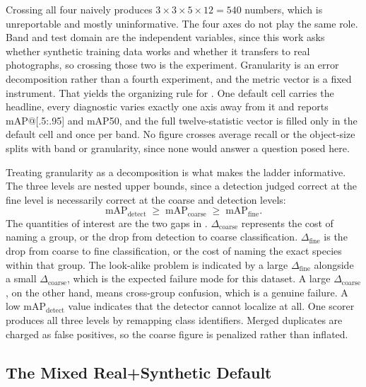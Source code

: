 Crossing all four naively produces $3 \times 3 \times 5 \times 12 = 540$ numbers, which is unreportable and mostly uninformative. The four axes do not play the same role. Band and test domain are the independent variables, since this work asks whether synthetic training data works and whether it transfers to real photographs, so crossing those two is the experiment. Granularity is an error decomposition rather than a fourth experiment, and the metric vector is a fixed instrument. That yields the organizing rule for . One default cell carries the headline, every diagnostic varies exactly one axis away from it and reports mAP@[.5:.95] and mAP50, and the full twelve-statistic vector is filled only in the default cell and once per band. No figure crosses average recall or the object-size splits with band or granularity, since none would answer a question posed here.

Treating granularity as a decomposition is what makes the ladder informative. The three levels are nested upper bounds, since a detection judged correct at the fine level is necessarily correct at the coarse and detection levels:
\begin{equation}
    \mathrm{mAP}_{\text{detect}} \;\geq\; \mathrm{mAP}_{\text{coarse}} \;\geq\; \mathrm{mAP}_{\text{fine}} .
    \label{eq:granularity-ladder}
\end{equation}
The quantities of interest are the two gaps in . $\Delta_{\text{coarse}}$ represents the cost of naming a group, or the drop from detection to coarse classification. $\Delta_{\text{fine}}$ is the drop from coarse to fine classification, or the cost of naming the exact species within that group. The look-alike problem is indicated by a large $\Delta_{\text{fine}}$ alongside a small $\Delta_{\text{coarse}}$, which is the expected failure mode for this dataset. A large $\Delta_{\text{coarse}}$, on the other hand, means cross-group confusion, which is a genuine failure. A low $\mathrm{mAP}_{\text{detect}}$ value indicates that the detector cannot localize at all. One scorer produces all three levels by remapping class identifiers. Merged duplicates are charged as false positives, so the coarse figure is penalized rather than inflated.

\subsection{The Mixed Real+Synthetic Default}\label{sec:mixed_default}

